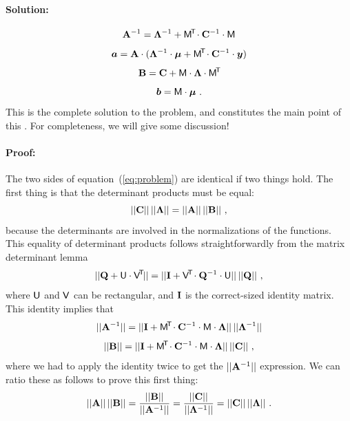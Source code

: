 \paragraph{Solution:}
\begin{equation}\label{eq:A}
\mathbf{A}^{-1} = \mathbf{\Lambda}^{-1} + \mathsf{M}^{\!\mathsf{T}\!} \cdot \mathbf{C}^{-1} \cdot \mathsf{M}
\end{equation}
\begin{equation}\label{eq:a}
\boldsymbol{a} = \mathbf{A} \cdot (\mathbf{\Lambda}^{-1} \cdot \boldsymbol{\mu} + \mathsf{M}^{\!\mathsf{T}\!} \cdot \mathbf{C}^{-1} \cdot \boldsymbol{y})
\end{equation}
\begin{equation}\label{eq:B}
\mathbf{B} = \mathbf{C} + \mathsf{M} \cdot \mathbf{\Lambda} \cdot \mathsf{M}^{\!\mathsf{T}\!}
\end{equation}
\begin{equation}\label{eq:b}
\boldsymbol{b} = \mathsf{M} \cdot \boldsymbol{\mu}
~ .
\end{equation}
This is the complete solution to the problem, and constitutes the main point
of this \documentname.
For completeness, we will give some discussion!

\paragraph{Proof:}
The two sides of equation~(\ref{eq:problem}) are identical if two things hold.
The first thing is that the determinant products must be equal:
\begin{equation}
||\mathbf{C}||\,||\mathbf{\Lambda}|| = ||\mathbf{A}||\,||\mathbf{B}||
~ ,
\end{equation}
because the determinants are involved in the normalizations of the
functions.
This equality of determinant products follows straightforwardly from
the matrix determinant lemma
\begin{equation}\label{eq:detlemma}
||\mathbf{Q} + \mathsf{U}\cdot\mathsf{V}^{\!\mathsf{T}\!}|| = ||\mathbf{I} + \mathsf{V}^{\!\mathsf{T}\!}\cdot\mathbf{Q}^{-1}\cdot\mathsf{U}||\,||\mathbf{Q}||
~ ,
\end{equation}
where $\mathsf{U}$ and $\mathsf{V}$ can be rectangular, and $\mathbf{I}$ is the correct-sized identity matrix.
This identity implies that
\begin{equation}
||\mathbf{A}^{-1}|| = ||\mathbf{I} + \mathsf{M}^{\!\mathsf{T}\!}\cdot\mathbf{C}^{-1}\cdot\mathsf{M}\cdot\mathbf{\Lambda}||\,||\mathbf{\Lambda}^{-1}||
\end{equation}
\begin{equation}
||\mathbf{B}||     = ||\mathbf{I} + \mathsf{M}^{\!\mathsf{T}\!}\cdot\mathbf{C}^{-1}\cdot\mathsf{M}\cdot\mathbf{\Lambda}||\,||\mathbf{C}||
~,
\end{equation}
where we had to apply the identity twice to get the $||\mathbf{A}^{-1}||$ expression.
We can ratio these as follows to prove this first thing:
\begin{equation}
||\mathbf{A}||\,||\mathbf{B}||
 = \frac{||\mathbf{B}||}{||\mathbf{A}^{-1}||}
 = \frac{||\mathbf{C}||}{||\mathbf{\Lambda}^{-1}||}
 = ||\mathbf{C}||\,||\mathbf{\Lambda}||
~ .
\end{equation}

